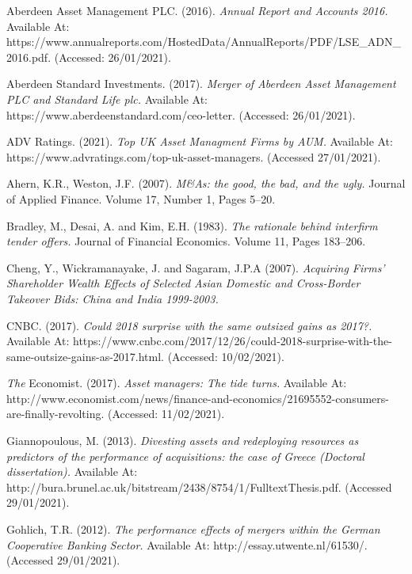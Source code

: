 \documentclass[11pt, english]{article}
\begin{document}
\begin{thebibliography}{9}

		Aberdeen Asset Management PLC. (2016).
		\textsl{Annual Report and Accounts 2016.}
		Available At: https://www.annualreports.com/HostedData/AnnualReports/PDF/LSE\_ADN\_ 2016.pdf. (Accessed: 26/01/2021).

		Aberdeen Standard Investments. (2017).
		\textsl{Merger of Aberdeen Asset Management PLC and Standard Life plc.}
		Available At: https://www.aberdeenstandard.com/ceo-letter. (Accessed: 26/01/2021).

		ADV Ratings. (2021).
		\textsl{Top UK Asset Managment Firms by AUM.}
		Available At: https://www.advratings.com/top-uk-asset-managers. (Accessed 27/01/2021).
	
		Ahern, K.R., Weston, J.F. (2007).
		\textsl{M\&As: the good, the bad, and the ugly.}
		Journal of Applied Finance. Volume 17, Number 1, Pages 5--20.

		Bradley, M., Desai, A. and Kim, E.H. (1983).
		\textsl{The rationale behind interfirm tender offers.}
		Journal of Financial Economics. Volume 11, Pages 183--206.

		Cheng, Y., Wickramanayake, J. and Sagaram, J.P.A (2007).
		\textsl{Acquiring Firms' Shareholder Wealth Effects of Selected Asian Domestic and Cross-Border Takeover Bids: China and India 1999-2003.}

		CNBC. (2017).
		\textsl{Could 2018 surprise with the same outsized gains as 2017?.}
		Available At: https://www.cnbc.com/2017/12/26/could-2018-surprise-with-the-same-outsize-gains-as-2017.html. (Accessed: 10/02/2021).

		\textit{The} Economist. (2017).
		\textsl{Asset managers: The tide turns.}
		Available At: http://www.economist.com/news/finance-and-economics/21695552-consumers-are-finally-revolting. (Accessed: 11/02/2021).

        	Giannopoulous, M. (2013).
		\textsl{Divesting assets and redeploying resources as predictors of the performance of acquisitions: the case of Greece (Doctoral dissertation).}
		Available At: http://bura.brunel.ac.uk/bitstream/2438/8754/1/FulltextThesis.pdf. (Accessed 29/01/2021).

        	Gohlich, T.R. (2012).
		\textsl{The performance effects of mergers within the German Cooperative Banking Sector.}
		Available At: http://essay.utwente.nl/61530/. (Accessed 29/01/2021).


\end{thebibliography}
\end{document}
